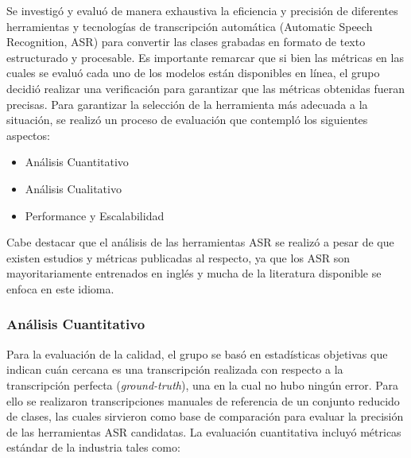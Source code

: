 Se investigó y evaluó de manera exhaustiva la eficiencia y precisión de diferentes herramientas y tecnologías de transcripción automática (Automatic Speech Recognition, ASR) para convertir las clases grabadas en formato de texto estructurado y procesable. Es importante remarcar que si bien las métricas en las cuales se evaluó cada uno de los modelos están disponibles en línea, el grupo decidió realizar una verificación para garantizar que las métricas obtenidas fueran precisas.
\medskip
Para garantizar la selección de la herramienta más adecuada a la situación, se realizó un proceso de evaluación que contempló los siguientes aspectos:
\begin{itemize}
    \item Análisis Cuantitativo
    \item Análisis Cualitativo
    \item Performance y Escalabilidad
\end{itemize}

Cabe destacar que el análisis de las herramientas ASR se realizó a pesar de que existen estudios y métricas publicadas al respecto, ya que los ASR son mayoritariamente entrenados en inglés y mucha de la literatura disponible se enfoca en este idioma.

\subsubsection{Análisis Cuantitativo}
\label{subsubsection:3-Análisis Cuantitativo}

Para la evaluación de la calidad, el grupo se basó en estadísticas objetivas que indican cuán cercana es una transcripción realizada con respecto a la transcripción perfecta (\textit{ground-truth}), una en la cual no hubo ningún error. Para ello se realizaron transcripciones manuales de referencia de un conjunto reducido de clases, las cuales sirvieron como base de comparación para evaluar la precisión de las herramientas ASR candidatas. La evaluación cuantitativa incluyó métricas estándar de la industria tales como:

